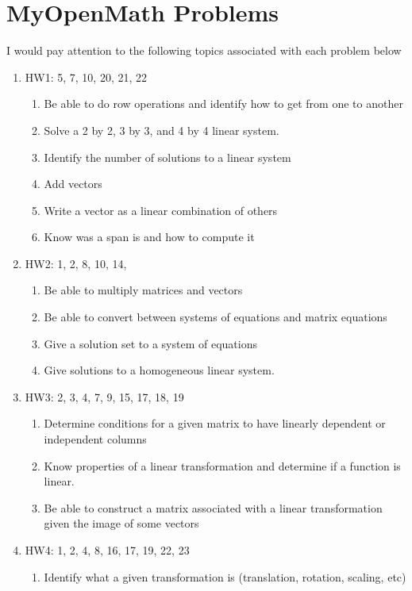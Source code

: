 \documentclass[12pt]{article}
\begin{document}
\section{MyOpenMath Problems}
I would pay attention to the following topics associated with each problem below
\begin{enumerate}
    \item HW1: 5, 7, 10, 20, 21, 22
    \begin{enumerate}
        \item Be able to do row operations and identify how to get from one to another
        \item Solve a 2 by 2, 3 by 3, and 4 by 4 linear system.
        \item Identify the number of solutions to a linear system
        \item Add vectors
        \item Write a vector as a linear combination of others
        \item Know was a span is and how to compute it
    \end{enumerate}
    \item HW2: 1, 2, 8, 10, 14,
    \begin{enumerate}
        \item Be able to multiply matrices and vectors
        \item Be able to convert between systems of equations and matrix equations
        \item Give a solution set to a system of equations
        \item Give solutions to a homogeneous linear system.
    \end{enumerate}
    \item HW3: 2, 3, 4, 7, 9, 15, 17, 18, 19
    \begin{enumerate}
        \item Determine conditions for a given matrix to have linearly dependent or independent
            columns
        \item Know properties of a linear transformation and determine if a function
            is linear.
        \item Be able to construct a matrix associated with a linear transformation
            given the image of some vectors
    \end{enumerate}
    \item HW4: 1, 2, 4, 8, 16, 17, 19, 22, 23
    \begin{enumerate}
        \item Identify what a given transformation is (translation, rotation, scaling, etc)

\end{enumerate}
\end{enumerate}
\end{document}
